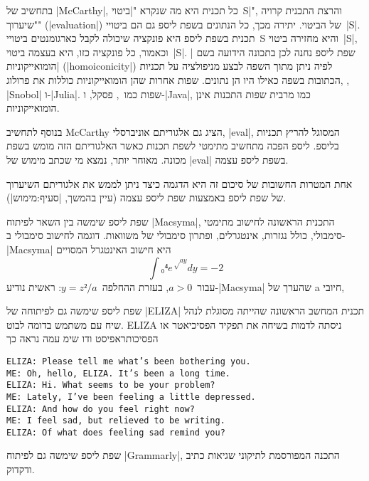 בתחשיב של \E|McCarthy|, כל תכנית היא מה שנקרא "\ע|ביטוי~S|", והרצת התכנית קרויה
"שיערוך" (\E|evaluation|) של הביטוי. יתירה מכך, כל הנתונים בשפת ליספ גם הם
ביטויי~\E|S|. תכנית בשפת ליספ היא פונקציה שיכולה לקבל כארגומנטים ביטויי~S והיא
מחזירה ביטוי~\E|S|, וכאמור, כל פונקציה כזו, היא בעצמה ביטוי~\E|S|. שפת ליספ
נחנה לכן בתכונה הידועה בשם \ע|הומואייקוניות| (\E|homoiconicity|) לפיה ניתן מתוך
השפה לבצע מניפולציה על תכניות הכתובות בשפה כאילו היו הן נתונים. שפות אחרות שהן
הומואייקוניות כוללות את פרולוג, , \E|Snobol|
ו-\E|Julia|. שפות כמו~\CPL, פסקל, ו-\E|Java|, כמו מרבית שפות התכנות אינן
הומואייקוניות.

בנוסף לתחשיב McCarthy הציג גם אלגוריתם אוניברסלי, \E|eval|, המסוגל להריץ תכניות
בליספ. ליספ הפכה מתחשיב מתימטי לשפת תכנות כאשר האלגוריתם הזה מומש בשפת מכונה.
מאוחר יותר, נמצא מי שכתב מימוש של \E|eval| בשפת ליספ עצמה.

אחת המטרות החשובות של סיכום זה היא הדגמה כיצד ניתן לממש את אלגוריתם השיערוך של
שפת ליספ באמצעות שפת ליספ עצמה (עיין בהמשך, |סעיף:מימוש|).

שפת ליספ שימשה בין השאר לפיתוח \E|Macsyma|, התכנית הראשונה לחישוב מתימטי
סימבולי, כולל נגזרות, אינטגרלים, ופתרון סימבולי של משוואות.
דוגמה לחישוב סימבולי ב-\E|Macsyma| היא חישוב האינטגרל המסויים \[
  ∫₀⁴ e^{√{ay}}dy=-2
\] עבור~$a>0$, בעזרת ההחלפה~$y=z²/a$:
ראשית נודיע-\E|Macsyma| שהערך של a חיובי,


שפת ליספ שימשה גם לפיתוחה של \E|ELIZA| תכנית המחשב הראשונה שהייתה מסוגלת לנהל
שיח עם משתמש בדומה לבוט. ELIZA ניסתה לדמות בשיחה את תפקיד הפסיכיאטר או
הפסיכותראפיסט ודו שימ עמה נראה כך

\begin{minipage}\textwidth
  \begin{LTR}
    \scriptsize
    \begin{verbatim}
ELIZA: Please tell me what’s been bothering you.
ME: Oh, hello, ELIZA. It’s been a long time.
ELIZA: Hi. What seems to be your problem?
ME: Lately, I’ve been feeling a little depressed.
ELIZA: And how do you feel right now?
ME: I feel sad, but relieved to be writing.
ELIZA: Of what does feeling sad remind you?
\end{verbatim}
  \end{LTR}
\end{minipage}
שפת ליספ שימשה גם לפיתוח
\E|Grammarly|, התכנה המפורסמת לתיקוני שגיאות כתיב ודקדוק.


